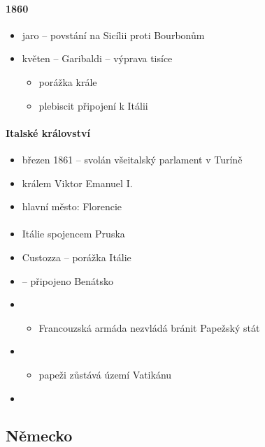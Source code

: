 \paragraph{1860}
\begin{itemize}
\item jaro -- povstání na Sicílii proti Bourbonům
\item květen -- Garibaldi -- výprava tisíce 
	\begin{itemize}
	\item porážka krále 
	\item[\ra] plebiscit \ra připojení k Itálii
	\end{itemize}
\end{itemize}

\paragraph{Italské království}
\begin{itemize}
\item březen 1861 -- svolán všeitalský parlament v Turíně
\item králem Viktor Emanuel \ra I.
\item hlavní město: Florencie
\end{itemize}

\paragraph{}
\begin{itemize}
\item Itálie spojencem Pruska
\item Custozza -- porážka Itálie
\item {} -- připojeno Benátsko
\item {}
	\begin{itemize}
	\item Francouzská armáda nezvládá bránit Papežský stát
	\end{itemize}
\item {}
	\begin{itemize}
	\item papeži zůstává území Vatikánu
	\end{itemize}
\item {}
\end{itemize}

\subsection{Německo}
